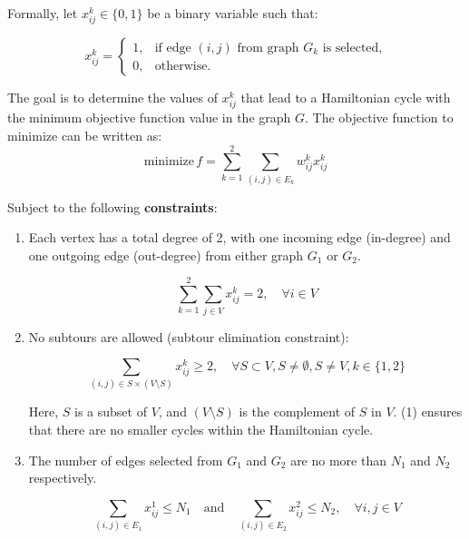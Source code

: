 \documentclass{extarticle}
\begin{document}
Formally, let $x_{ij}^k \in \{0, 1\}$ be a binary variable such that:

\begin{equation*}
  x_{ij}^k =
  \begin{cases}
    1, & \text{if edge } (i, j) \text{ from graph } G_k \text{ is selected,} \\
    0, & \text{otherwise.}
  \end{cases}
\end{equation*}

The goal is to determine the values of $x_{ij}^k$ that lead to a Hamiltonian
cycle with the minimum objective function value in the graph $G$. The objective
function to minimize can be written as:
\begin{equation*}
  \text{minimize} \, f = \sum_{k=1}^{2} \sum_{(i,j) \in E_k} w_{ij}^k x_{ij}^k
\end{equation*}

Subject to the following \textbf{constraints}:

\begin{enumerate}
  \item Each vertex has a total degree of 2, with one incoming edge (in-degree) and one
        outgoing edge (out-degree) from either graph $G_1$ or $G_2$.

        \begin{equation*}
          \sum_{k=1}^{2} \sum_{j \in V} x_{ij}^k = 2, \quad \forall i \in V
        \end{equation*}
  \item No subtours are allowed (subtour elimination constraint):

        \begin{equation}
          \sum_{(i,j) \in S \times (V \setminus S)} x_{ij}^k \geq 2, \quad \forall S \subset V, S \neq \emptyset, S \neq V, k \in \{1, 2\}
        \end{equation}

        Here, $S$ is a subset of $V$, and $(V \setminus S)$ is the complement of $S$ in
        $V$. (1) ensures that there are no smaller cycles within the Hamiltonian cycle.
  \item The number of edges selected from $G_1$ and $G_2$ are no more than $N_1$ and
        $N_2$ respectively.

        \begin{equation*}
          \sum_{(i,j) \in E_1} x_{ij}^1 \leq N_1 \quad \text{and} \quad \sum_{(i,j) \in E_2} x_{ij}^2 \leq N_2,  \quad \forall i,j \in V
        \end{equation*}
\end{enumerate}
\end{document}
